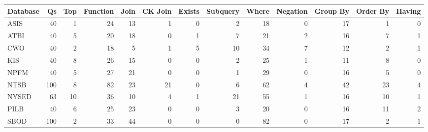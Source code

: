\begin{tabular}{lrrrrrrrrrrrr}
\toprule
Database & Qs & Top & Function & Join & CK Join & Exists & Subquery & Where & Negation & Group By & Order By & Having \\
\midrule
ASIS & 40 & 1 & 24 & 13 & 1 & 0 & 2 & 18 & 0 & 17 & 1 & 0 \\
ATBI & 40 & 5 & 20 & 18 & 0 & 1 & 7 & 21 & 2 & 16 & 7 & 1 \\
CWO & 40 & 2 & 18 & 5 & 1 & 5 & 10 & 34 & 7 & 12 & 2 & 1 \\
KIS & 40 & 8 & 26 & 15 & 0 & 0 & 2 & 25 & 1 & 11 & 8 & 0 \\
NPFM & 40 & 5 & 27 & 21 & 0 & 0 & 1 & 29 & 0 & 16 & 5 & 0 \\
NTSB & 100 & 8 & 82 & 23 & 21 & 0 & 6 & 62 & 4 & 42 & 23 & 4 \\
NYSED & 63 & 10 & 36 & 10 & 4 & 1 & 21 & 55 & 1 & 16 & 10 & 1 \\
PILB & 40 & 6 & 25 & 23 & 0 & 0 & 3 & 20 & 0 & 16 & 11 & 2 \\
SBOD & 100 & 2 & 33 & 44 & 0 & 0 & 0 & 82 & 0 & 17 & 2 & 1 \\
\bottomrule
\end{tabular}
